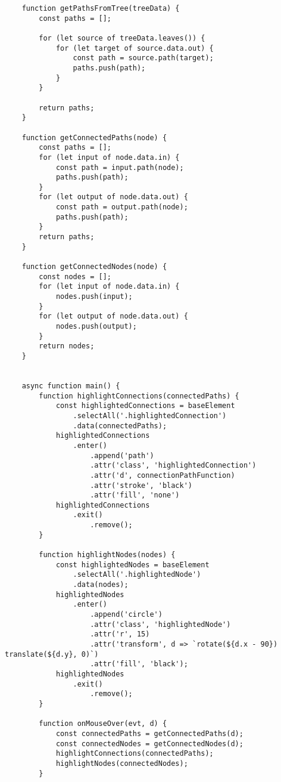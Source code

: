 \begin{lstlisting}
    function getPathsFromTree(treeData) {
        const paths = [];
    
        for (let source of treeData.leaves()) {
            for (let target of source.data.out) {
                const path = source.path(target);
                paths.push(path);
            }
        }
    
        return paths;
    }
    
    function getConnectedPaths(node) {
        const paths = [];
        for (let input of node.data.in) {
            const path = input.path(node);
            paths.push(path);
        }
        for (let output of node.data.out) {
            const path = output.path(node);
            paths.push(path);
        }
        return paths;
    }
    
    function getConnectedNodes(node) {
        const nodes = [];
        for (let input of node.data.in) {
            nodes.push(input);
        }
        for (let output of node.data.out) {
            nodes.push(output);
        }
        return nodes;
    }
    
    
    async function main() {
        function highlightConnections(connectedPaths) {
            const highlightedConnections = baseElement
                .selectAll('.highlightedConnection')
                .data(connectedPaths);
            highlightedConnections
                .enter()
                    .append('path')
                    .attr('class', 'highlightedConnection')
                    .attr('d', connectionPathFunction)
                    .attr('stroke', 'black')
                    .attr('fill', 'none')
            highlightedConnections
                .exit()
                    .remove();
        }
    
        function highlightNodes(nodes) {
            const highlightedNodes = baseElement
                .selectAll('.highlightedNode')
                .data(nodes);
            highlightedNodes
                .enter()
                    .append('circle')
                    .attr('class', 'highlightedNode')
                    .attr('r', 15)
                    .attr('transform', d => `rotate(${d.x - 90}) translate(${d.y}, 0)`)
                    .attr('fill', 'black');
            highlightedNodes
                .exit()
                    .remove();
        }
    
        function onMouseOver(evt, d) {
            const connectedPaths = getConnectedPaths(d);
            const connectedNodes = getConnectedNodes(d);
            highlightConnections(connectedPaths);
            highlightNodes(connectedNodes);
        }
        

\end{lstlisting}
